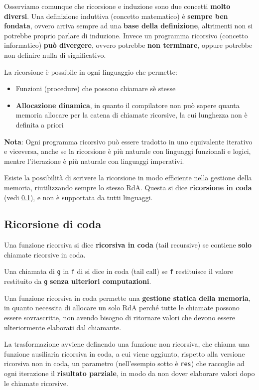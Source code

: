 \documentclass[12pt,a4paper]{article}
\begin{document}
Osserviamo comunque che ricorsione e induzione sono due concetti \textbf{molto diversi}. Una definizione induttiva (concetto matematico) è \textbf{sempre ben fondata}, ovvero arriva sempre ad una \textbf{base della definizione}, altrimenti non si potrebbe proprio parlare di induzione. Invece un programma ricorsivo (concetto informatico) \textbf{può divergere}, ovvero potrebbe \textbf{non terminare}, oppure potrebbe non definire nulla di significativo.

La ricorsione è possibile in ogni linguaggio che permette:
\begin{itemize}
\item Funzioni (procedure) che possono chiamare sè stesse
\item \textbf{Allocazione dinamica}, in quanto il compilatore non può sapere quanta memoria allocare per la catena di chiamate ricorsive, la cui lunghezza non è definita a priori
\end{itemize}
\textbf{Nota}: Ogni programma ricorsivo può essere tradotto in uno equivalente iterativo e viceversa, anche se la ricorsione è più naturale con linguaggi funzionali e logici, mentre l'iterazione è più naturale con linguaggi imperativi.

Esiste la possibilità di scrivere la ricorsione in modo efficiente nella gestione della memoria, riutilizzando sempre lo stesso RdA. Questa si dice \textbf{ricorsione in coda} (vedi \ref{ricorsione di coda}), e non è supportata da tutti linguaggi.
\subsection{Ricorsione di coda}\label{ricorsione di coda}
Una funzione ricorsiva si dice \textbf{ricorsiva in coda} (tail recursive) se contiene \textbf{solo} chiamate ricorsive in coda.

Una chiamata di \texttt{g} in \texttt{f} di si dice in coda (tail call) se \texttt{f} restituisce il valore restituito da \texttt{g} \textbf{senza ulteriori computazioni}.

Una funzione ricorsiva in coda permette una \textbf{gestione statica della memoria}, in quanto necessita di allocare un solo RdA perché tutte le chiamate possono essere sovrascritte, non avendo bisogno di ritornare valori che devono essere ulteriormente elaborati dal chiamante.

La trasformazione avviene definendo una funzione non ricorsiva, che chiama una funzione ausiliaria ricorsiva in coda, a cui viene aggiunto, rispetto alla versione ricorsiva non in coda, un parametro (nell'esempio sotto è \texttt{res}) che raccoglie ad ogni iterazione il \textbf{risultato parziale}, in modo da non dover elaborare valori dopo le chiamate ricorsive.
\end{document}
